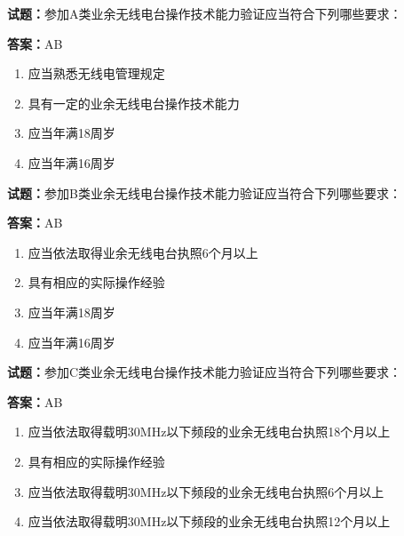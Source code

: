 \documentclass{ctexbook}
\begin{document}
\vspace{1em}

\textbf{试题：}参加A类业余无线电台操作技术能力验证应当符合下列哪些要求： 

\textbf{答案：}AB 

\begin{enumerate}[leftmargin=3em]
  \item 应当熟悉无线电管理规定 

  \item 具有一定的业余无线电台操作技术能力 

  \item 应当年满18周岁 

  \item 应当年满16周岁 

\end{enumerate}





\vspace{1em}

\textbf{试题：}参加B类业余无线电台操作技术能力验证应当符合下列哪些要求： 

\textbf{答案：}AB 

\begin{enumerate}[leftmargin=3em]
  \item 应当依法取得业余无线电台执照6个月以上 

  \item 具有相应的实际操作经验 

  \item 应当年满18周岁 

  \item 应当年满16周岁 

\end{enumerate}





\vspace{1em}

\textbf{试题：}参加C类业余无线电台操作技术能力验证应当符合下列哪些要求： 

\textbf{答案：}AB 

\begin{enumerate}[leftmargin=3em]
  \item 应当依法取得载明30MHz以下频段的业余无线电台执照18个月以上 

  \item 具有相应的实际操作经验 

  \item 应当依法取得载明30MHz以下频段的业余无线电台执照6个月以上 

  \item 应当依法取得载明30MHz以下频段的业余无线电台执照12个月以上 

\end{enumerate}
\end{document}
